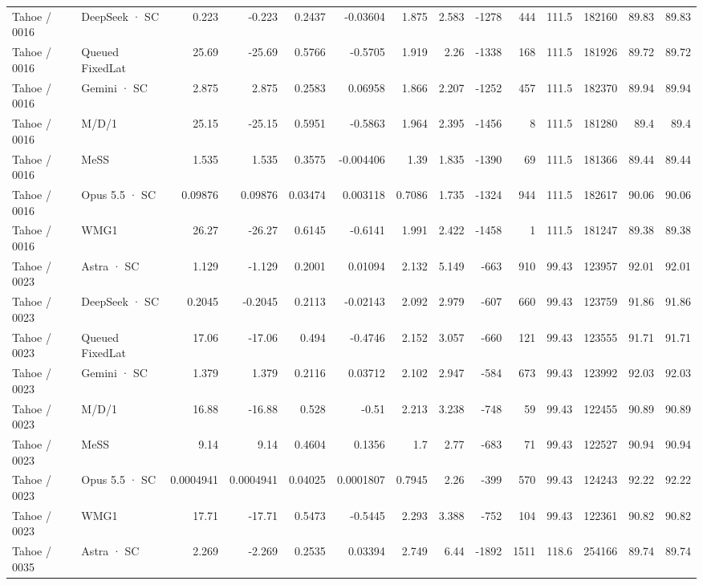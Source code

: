 \begin{tabular}{llrrrrrrrrrrrr}
Tahoe / 0016 & DeepSeek · SC & 0.223 & -0.223 & 0.2437 & -0.03604 & 1.875 & 2.583 & -1278 & 444 & 111.5 & 182160 & 89.83 & 89.83 \\
Tahoe / 0016 & Queued FixedLat & 25.69 & -25.69 & 0.5766 & -0.5705 & 1.919 & 2.26 & -1338 & 168 & 111.5 & 181926 & 89.72 & 89.72 \\
Tahoe / 0016 & Gemini · SC & 2.875 & 2.875 & 0.2583 & 0.06958 & 1.866 & 2.207 & -1252 & 457 & 111.5 & 182370 & 89.94 & 89.94 \\
Tahoe / 0016 & M/D/1 & 25.15 & -25.15 & 0.5951 & -0.5863 & 1.964 & 2.395 & -1456 & 8 & 111.5 & 181280 & 89.4 & 89.4 \\
Tahoe / 0016 & MeSS & 1.535 & 1.535 & 0.3575 & -0.004406 & 1.39 & 1.835 & -1390 & 69 & 111.5 & 181366 & 89.44 & 89.44 \\
Tahoe / 0016 & Opus 5.5 · SC & 0.09876 & 0.09876 & 0.03474 & 0.003118 & 0.7086 & 1.735 & -1324 & 944 & 111.5 & 182617 & 90.06 & 90.06 \\
Tahoe / 0016 & WMG1 & 26.27 & -26.27 & 0.6145 & -0.6141 & 1.991 & 2.422 & -1458 & 1 & 111.5 & 181247 & 89.38 & 89.38 \\
Tahoe / 0023 & Astra · SC & 1.129 & -1.129 & 0.2001 & 0.01094 & 2.132 & 5.149 & -663 & 910 & 99.43 & 123957 & 92.01 & 92.01 \\
Tahoe / 0023 & DeepSeek · SC & 0.2045 & -0.2045 & 0.2113 & -0.02143 & 2.092 & 2.979 & -607 & 660 & 99.43 & 123759 & 91.86 & 91.86 \\
Tahoe / 0023 & Queued FixedLat & 17.06 & -17.06 & 0.494 & -0.4746 & 2.152 & 3.057 & -660 & 121 & 99.43 & 123555 & 91.71 & 91.71 \\
Tahoe / 0023 & Gemini · SC & 1.379 & 1.379 & 0.2116 & 0.03712 & 2.102 & 2.947 & -584 & 673 & 99.43 & 123992 & 92.03 & 92.03 \\
Tahoe / 0023 & M/D/1 & 16.88 & -16.88 & 0.528 & -0.51 & 2.213 & 3.238 & -748 & 59 & 99.43 & 122455 & 90.89 & 90.89 \\
Tahoe / 0023 & MeSS & 9.14 & 9.14 & 0.4604 & 0.1356 & 1.7 & 2.77 & -683 & 71 & 99.43 & 122527 & 90.94 & 90.94 \\
Tahoe / 0023 & Opus 5.5 · SC & 0.0004941 & 0.0004941 & 0.04025 & 0.0001807 & 0.7945 & 2.26 & -399 & 570 & 99.43 & 124243 & 92.22 & 92.22 \\
Tahoe / 0023 & WMG1 & 17.71 & -17.71 & 0.5473 & -0.5445 & 2.293 & 3.388 & -752 & 104 & 99.43 & 122361 & 90.82 & 90.82 \\
Tahoe / 0035 & Astra · SC & 2.269 & -2.269 & 0.2535 & 0.03394 & 2.749 & 6.44 & -1892 & 1511 & 118.6 & 254166 & 89.74 & 89.74 \\

\end{tabular}
